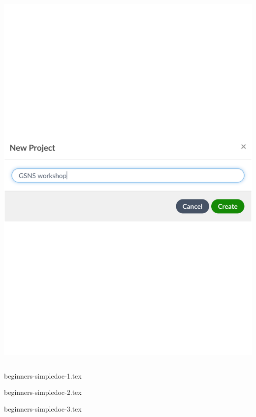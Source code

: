 \documentclass{../../cursuspresentatie}
\def\importslide#1#2{%
	{#2}
}
\begin{document}
\begin{frame}
\begin{columns}
\begin{column}{0.4\textwidth}
		  \includegraphics[width=1\textwidth]{images/project_name.pdf}
		\end{column}
	\end{columns}
\end{frame}


\importslide{beginners}{beginners-simpledoc-1.tex}
\importslide{beginners}{beginners-simpledoc-2.tex}
\importslide{beginners}{beginners-simpledoc-3.tex}




% 

% 

% 

% 

% 

% 

%
	
\end{document}
